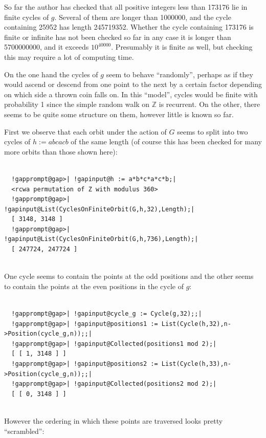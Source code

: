\documentclass[a4paper,11pt]{report}
\begin{document}
{{\begin{Verbatim}[commandchars=!@|,fontsize=\small,frame=single,label=Example]
\end{Verbatim}
 So far the author has checked that all positive integers less than 173176 lie
in finite cycles of $g$. Several of them are longer than 1000000, and the cycle containing 25952 has
length 245719352. Whether the cycle containing 173176 is finite or infinite
has not been checked so far \texttt{}\texttt{} in any
case it is longer than 5700000000, and it exceeds $10^{40000}$. Presumably it is finite as well, but checking this may require a lot of
computing time. 

 On the one hand the cycles of $g$ seem to behave ``randomly'', perhaps as if they would ascend or descend from one point to the next by a
certain factor depending on which side a thrown coin falls on.
\texttt{}\texttt{} In this ``model'', cycles would be finite with probability 1 since the simple random walk on
{\ensuremath{\mathbb Z}} is recurrent. On the other, there seems to be quite
some structure on them, however little is known so far. 

 First we observe that each orbit under the action of $G$ seems to split into two cycles of $h := abcacb$ of the same length (of course this has been checked for many more orbits than
those shown here): 
\begin{Verbatim}[commandchars=!@|,fontsize=\small,frame=single,label=Example]
  
  !gapprompt@gap>| !gapinput@h := a*b*c*a*c*b;|
  <rcwa permutation of Z with modulus 360>
  !gapprompt@gap>| !gapinput@List(CyclesOnFiniteOrbit(G,h,32),Length);|
  [ 3148, 3148 ]
  !gapprompt@gap>| !gapinput@List(CyclesOnFiniteOrbit(G,h,736),Length);|
  [ 247724, 247724 ]
  
\end{Verbatim}
 One cycle seems to contain the points at the odd positions and the other seems
to contain the points at the even positions in the cycle of $g$: 
\begin{Verbatim}[commandchars=!@|,fontsize=\small,frame=single,label=Example]
  
  !gapprompt@gap>| !gapinput@cycle_g := Cycle(g,32);;|
  !gapprompt@gap>| !gapinput@positions1 := List(Cycle(h,32),n->Position(cycle_g,n));;|
  !gapprompt@gap>| !gapinput@Collected(positions1 mod 2);|
  [ [ 1, 3148 ] ]
  !gapprompt@gap>| !gapinput@positions2 := List(Cycle(h,33),n->Position(cycle_g,n));;|
  !gapprompt@gap>| !gapinput@Collected(positions2 mod 2);|
  [ [ 0, 3148 ] ]
  
\end{Verbatim}
 However the ordering in which these points are traversed looks pretty ``scrambled'': 
\begin{Verbatim}[commandchars=!@|,fontsize=\small,frame=single,label=Example]
  

\end{Verbatim}}}
\end{document}
